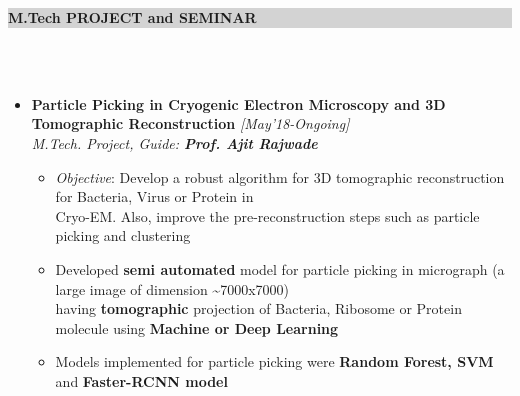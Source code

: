 \documentclass[a4paper,10pt]{article}
\newcommand{\lsep}{-0.5cm}
\newcommand{\hsep}{-0.6cm}
\newcommand{\resheading}[1]{{\small \colorbox{lightgray}{\begin{minipage}{1\textwidth}{\textbf{#1 \vphantom{p\^{E}}}}\end{minipage}}}}
\begin{document}
\hspace{-0.5cm}
\resheading{\textbf{\large M.Tech PROJECT and SEMINAR}}\\[\lsep] 
\\[-0.4cm]
\begin{itemize}
\item \textbf{Particle Picking in Cryogenic Electron Microscopy and 3D Tomographic Reconstruction}  \hfill\emph{[May'18-Ongoing]} \\
    \emph{M.Tech. Project, Guide: \textbf{Prof. Ajit Rajwade}} \\[\hsep]
        \begin{itemize}
            \item \textit{Objective}: Develop a robust algorithm for 3D tomographic reconstruction for Bacteria, Virus or Protein in\\[-0.05cm] Cryo-EM. Also, improve the pre-reconstruction steps such as particle picking and clustering\\[-0.55cm] 
	        \item Developed \textbf{semi automated} model for particle picking in micrograph (a large image of dimension \textasciitilde 7000x7000)\\[-0.05cm] having \textbf{tomographic} projection of Bacteria, Ribosome or Protein molecule using \textbf{Machine or Deep Learning} \\[-0.55cm] 
	        \item Models implemented for particle picking were \textbf{Random Forest, SVM} and \textbf{Faster-RCNN model}\\[-0.55cm] 
	        
        \end{itemize}


\end{itemize}
\end{document}
